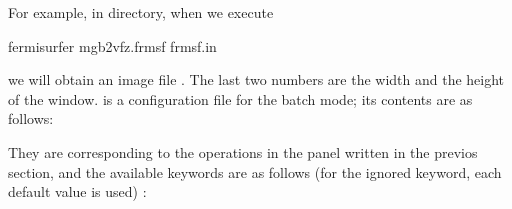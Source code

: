 \documentclass[letterpaper,10pt,pdftex,openany,english]{sphinxmanual}
\begin{document}
\sphinxAtStartPar
For example, in  directory, when we execute

\begin{sphinxVerbatim}[commandchars=\\\{\}]
\PYGZdl{} fermisurfer mgb2\PYGZus{}vfz.frmsf frmsf.in  
\end{sphinxVerbatim}

\sphinxAtStartPar
we will obtain an image file .
The last two numbers are the width and the height of the window.
 is a configuration file for the batch mode;
its contents are as follows:

\begin{sphinxVerbatim}[commandchars=\\\{\}]
    
   
             
       
     
          
       
      
        
      
    
         
          
         
    
     
    
\end{sphinxVerbatim}

\sphinxAtStartPar
They are corresponding to the operations in the panel
written in the previos section,
and the available keywords are as follows
(for the ignored keyword, each default value is used) :
\end{document}
